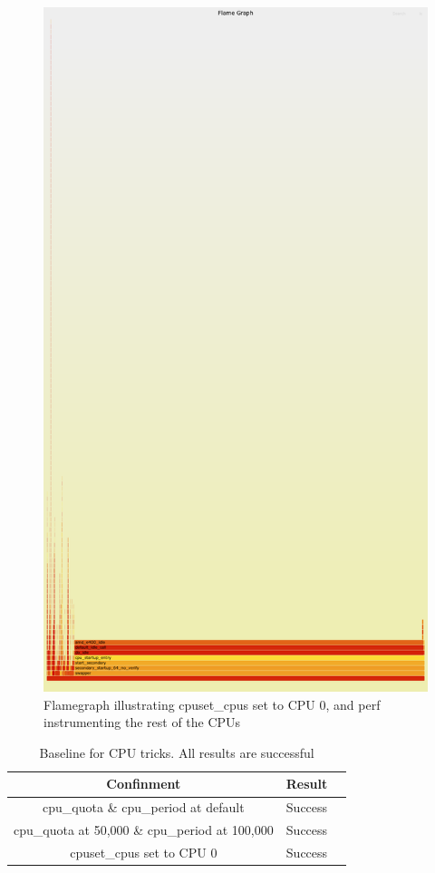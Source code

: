 \documentclass{report}  %
\begin{document}
\begin{figure}[H]
    \centering
    \includegraphics[scale=0.2]{cpu_tricks/6.1.0/V2/flamegraph_20241021_102607.png}
    \caption{Flamegraph illustrating cpuset\_cpus set to CPU 0, and perf instrumenting the rest of the CPUs}
    \label{fig:flamegraph}
\end{figure}


\begin{table}[h!]
\centering
\begin{tabular}{|c|c|c|}
\hline
Confinment & Result \\ \hline
cpu\_quota \& cpu\_period at default & Success \\ \hline
cpu\_quota at 50,000 \& cpu\_period at 100,000 & Success \\ \hline
cpuset\_cpus set to CPU 0 & Success \\ \hline
\end{tabular}
\caption{Baseline for CPU tricks. All results are successful}
\end{table}
\end{document}
